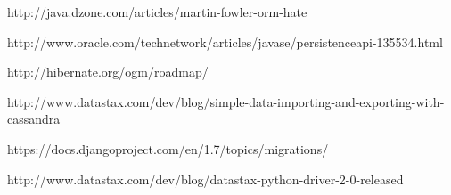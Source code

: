 \begin{thebibliography}{9}
http://java.dzone.com/articles/martin-fowler-orm-hate

http://www.oracle.com/technetwork/articles/javase/persistenceapi-135534.html

http://hibernate.org/ogm/roadmap/

http://www.datastax.com/dev/blog/simple-data-importing-and-exporting-with-cassandra

https://docs.djangoproject.com/en/1.7/topics/migrations/

http://www.datastax.com/dev/blog/datastax-python-driver-2-0-released

\end{thebibliography}
